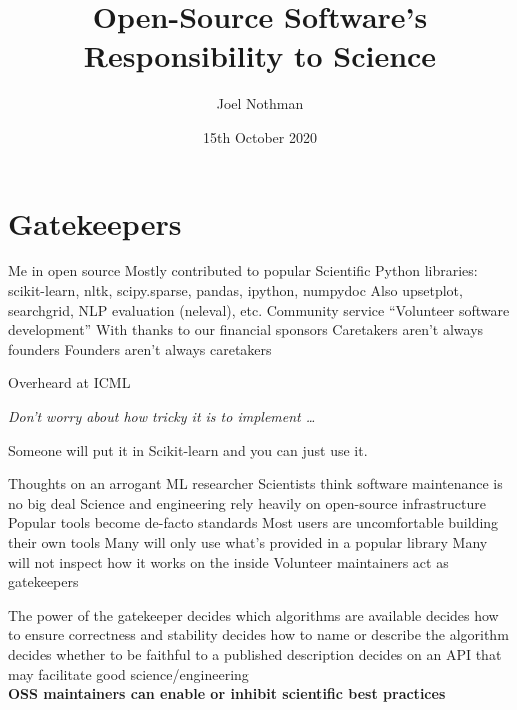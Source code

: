 \documentclass[aspectratio=169, 22pt]{beamer}
\title{Open-Source Software's Responsibility to Science}
\subtitle{}
\date{15th October 2020}
\author{Joel Nothman}
\newcommand{\hl}{\textcolor{usydred}}
\begin{document}
\titleslide

\section{Gatekeepers}

\begin{points}{Me in open source}
	\p Mostly contributed to popular Scientific Python libraries:\\
	scikit-learn, nltk, scipy.sparse, pandas, ipython, numpydoc
	\p Also upsetplot, searchgrid, NLP evaluation (neleval), etc.
	\vfill
	\p Community service
	\p ``Volunteer software development''
	\p With thanks to our financial sponsors
	\vfill
	\p Caretakers aren't always founders
	\p Founders aren't always caretakers
\end{points}

\begin{centre}{Overheard at ICML}
	\parbox{\textwidth}{
		\Large
		\it
	Don't worry about how tricky it is to implement \ldots

	\vspace{2em}

	\raggedleft Someone will put it in Scikit-learn and you can just use it.
	}
\end{centre}

\begin{points}{Thoughts on an arrogant ML researcher}
	\p Scientists think software maintenance is no big deal
	\pause
	\vfill
	\p Science and engineering rely heavily on open-source infrastructure
	\p Popular tools become de-facto standards
	\vfill
	\p Most users are uncomfortable building their own tools
	\p Many will only use what's provided in a popular library
	\p Many will not inspect how it works on the inside
	\vfill
	\p Volunteer maintainers act as gatekeepers
\end{points}

\begin{points}{The power of the gatekeeper}
	\p decides \hl{which algorithms} are available
	\p decides how to ensure \hl{correctness} and stability
	\p decides how to \hl{name} or describe the algorithm
	\p decides whether to be \hl{faithful} to a published description
	\p decides on an \hl{API} that may facilitate good science/engineering
	\\
	\pause
	\vspace{2em}
	\hl{\bf OSS maintainers can enable or inhibit scientific best practices}
\end{points}
\end{document}
